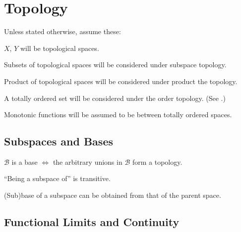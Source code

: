 \chapter{Topology}

\begin{conv}
	Unless stated otherwise, assume these:
	\begin{assmplist}
		\item $X$, $Y$ will be topological spaces.
		
		\item Subsets of topological spaces will be considered under subspace topology.
		
		\item Product of topological spaces will be considered under product the topology.
		
		\item A totally ordered set will be considered under the order topology. (See .)
		
		\item Monotonic functions will be assumed to be between totally ordered spaces.
	\end{assmplist}
\end{conv}



\section{Subspaces and Bases}

	\begin{lem}
		$\mathscr B$ is a base $\iff$ the arbitrary unions in $\mathscr B$ form a topology.
	\end{lem}
	
	\begin{lem}\label{LEM: subspaces and bases}
		\leavevmode
		\begin{mylist}
			\item ``Being a subspace of'' is transitive.
			
			\item\label{LEMii: subspaces and bases} (Sub)base of a subspace can be obtained from that of the parent space.
		\end{mylist}
	\end{lem}
	



\section{Functional Limits and Continuity}

